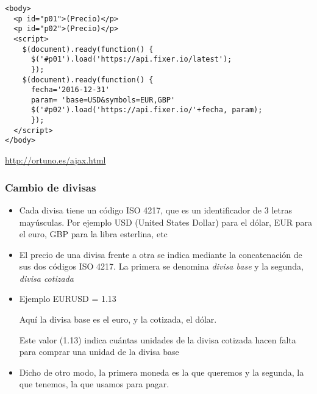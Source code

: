 \documentclass[ucs]{beamer}
\begin{document}
\begin{frame}[fragile]
\frametitle{}

  \begin{scriptsize}
  \begin{verbatim}
<body>
  <p id="p01">(Precio)</p>
  <p id="p02">(Precio)</p>
  <script>
    $(document).ready(function() {
      $('#p01').load('https://api.fixer.io/latest');
      });
    $(document).ready(function() {
      fecha='2016-12-31'
      param= 'base=USD&symbols=EUR,GBP'
      $('#p02').load('https://api.fixer.io/'+fecha, param);
      });
  </script>
</body>
  \end{verbatim}
  \end{scriptsize}
\begin{tiny}
\begin{flushright}
\url{http://ortuno.es/ajax.html}
\end{flushright}
\end{tiny}
\end{frame}


\begin{frame}[fragile]
\frametitle{Cambio de divisas}
\begin{itemize}
\item
Cada divisa tiene un código ISO 4217, que es un identificador de 3 letras mayúsculas.
Por ejemplo USD (United States Dollar) para el dólar, EUR para el euro, GBP para la libra esterlina,
etc

\item
El precio de una divisa frente a otra se indica mediante la concatenación de sus dos códigos ISO 4217.
La primera se denomina \emph{divisa base}
y la segunda,
\emph{divisa cotizada}

\item
Ejemplo EURUSD = 1.13

Aquí la divisa base es el euro, y la cotizada, el dólar. 

Este valor (1.13) indica cuántas
unidades de la divisa cotizada hacen falta para
comprar una unidad de la divisa base 

\item
Dicho de otro modo, la primera moneda es la que queremos
y la segunda, la que tenemos, la que usamos para pagar.

\end{itemize}
\end{frame}
\end{document}
